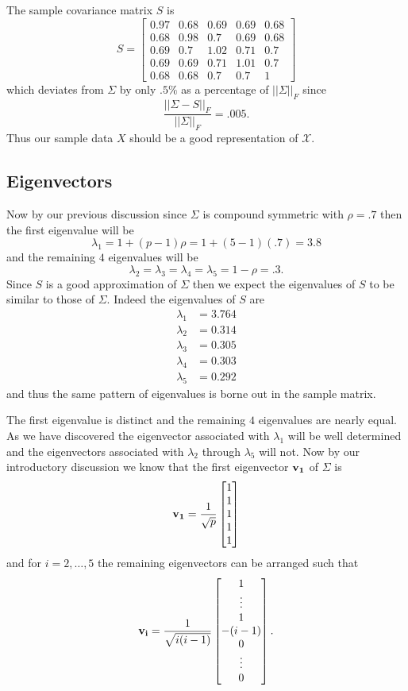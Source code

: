 \documentclass{book}
\newcommand{\bs}[1]{\boldsymbol{#1}}
\newcommand{\rv}[1]{\bs{\mathscr{#1}}}
\begin{document}
The sample covariance matrix $S$ is
$$
S=
\begin{bmatrix}
0.97& 0.68& 0.69& 0.69& 0.68\\
0.68& 0.98& 0.7& 0.69& 0.68\\
0.69& 0.7& 1.02& 0.71& 0.7\\
0.69& 0.69& 0.71& 1.01& 0.7\\
0.68& 0.68& 0.7& 0.7& 1
\end{bmatrix}
$$
which deviates from $\Sigma$ by only $.5\%$ as a percentage of $||\Sigma||_F$ since
$$
\frac{||\Sigma-S||_F}{||\Sigma||_F}=.005.
$$
Thus our sample data $X$ should be a good representation of $\rv{X}$. 

\newpage
\subsection{Eigenvectors}

Now by our previous discussion since $\Sigma$ is compound symmetric with $\rho=.7$ then the first eigenvalue will be
$$
\lambda_1=1+(p-1)\rho=1+(5-1)(.7)=3.8
$$
and the remaining $4$ eigenvalues will be 
$$
\lambda_{2}=\lambda_3=\lambda_4=\lambda_5=1-\rho=.3.
$$
Since $S$ is a good approximation of $\Sigma$ then we expect the eigenvalues of $S$ to be similar to those of $\Sigma$. Indeed the eigenvalues of $S$ are
$$
\begin{aligned}
\lambda_1&=3.764\\ \lambda_2&=0.314\\ \lambda_3&=0.305\\ \lambda_4&=0.303\\ \lambda_5&=0.292
\end{aligned}
$$
and thus the same pattern of eigenvalues is borne out in the sample matrix. 

The first eigenvalue is distinct and the remaining $4$ eigenvalues are nearly equal. As we have discovered the eigenvector associated with $\lambda_1$ will be well determined and the eigenvectors associated with $\lambda_2$ through $\lambda_5$ will not. Now by our introductory discussion we know that the first eigenvector ${\bf v_1}$ of $\Sigma$ is
$$
{\bf v_1}=\frac{1}{\sqrt{p}}
\begin{bmatrix}
1\\
1\\
1\\
1\\
1
\end{bmatrix}
$$
and for $i=2,\ldots,5$ the remaining eigenvectors can be arranged such that 
$$
{\bf v_i}=\frac{1}{\sqrt{i(i-1)}}
\begin{bmatrix}
1\\
\vdots\\
1\\
-(i-1)\\
0\\
\vdots\\
0
\end{bmatrix}.
$$
\end{document}
